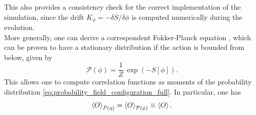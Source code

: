 This also provides a consistency check for the correct implementation of the simulation, since the drift $K_\phi = -\delta S / \delta \phi$ is computed numerically during the evolution. \\
More generally, one can derive a correspondent Fokker-Planck equation \cite{gardiner}, which can be proven to have a stationary distribution if the action is bounded from below, given by \cite{Damgaard1987StochasticQuantization}
\begin{equation}
    \mathcal{P}(\phi) = \frac{1}{Z} \, \exp\left(-S[\phi]\right).
    \label{eq:probability_field_configuration_full}
\end{equation}
This allows one to compute correlation functions as moments of the  probability distribution \eqref{eq:probability_field_configuration_full}. In particular, one has 
\begin{equation}
    \left\langle O \right\rangle_{P(\eta)} = \left\langle O \right\rangle_{\mathcal{P}(\phi)} \equiv \left\langle O \right\rangle.
    \label{eq:expectation_observables}
\end{equation}

